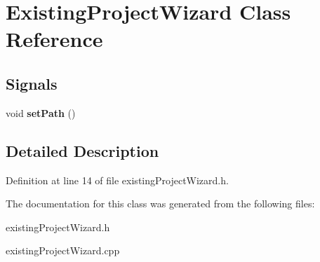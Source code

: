 \hypertarget{class_existing_project_wizard}{
\section{ExistingProjectWizard Class Reference}
\label{class_existing_project_wizard}
}
\subsection*{Signals}
\begin{DoxyCompactItemize}
\item 
\hypertarget{class_existing_project_wizard_a683cd87187cd40e714cefd7289aa209a}{
void {\bfseries setPath} ()}
\label{class_existing_project_wizard_a683cd87187cd40e714cefd7289aa209a}

\end{DoxyCompactItemize}


\subsection{Detailed Description}


Definition at line 14 of file existingProjectWizard.h.



The documentation for this class was generated from the following files:\begin{DoxyCompactItemize}
\item 
existingProjectWizard.h\item 
existingProjectWizard.cpp\end{DoxyCompactItemize}
